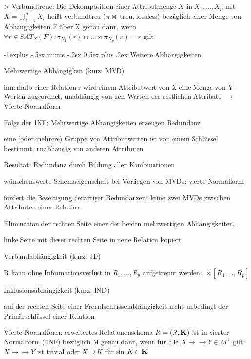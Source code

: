 \documentclass[a4paper]{article}
\makeatletter
\renewcommand{\subsection}{\@startsection{subsection}{2}{0mm}%
                                {-1explus -.5ex minus -.2ex}%
                                {0.5ex plus .2ex}%
                                {\normalfont\normalsize\bfseries}}
\makeatother
\begin{document}
\begin{multicols}{3}
> Verbundtreue: Die Dekomposition einer Attributmenge $X$ in $X_1,..., X_p$ mit $X = \bigcup_{i=1}^p X_i$ heißt verbundtreu ($\pi \bowtie$-treu, lossless) bezüglich einer Menge von Abhängigkeiten F über X genau dann, wenn $\forall r \in SAT_X(F): \pi_{X_1}(r) \bowtie ... \bowtie \pi_{X_p}(r) = r$ gilt.

\subsection{Weitere Abhängigkeiten}
\begin{itemize*}
    \item Mehrwertige Abhängigkeit (kurz: MVD)
    \begin{itemize*}
        \item innerhalb einer Relation r wird einem Attributwert von X eine Menge von Y-Werten zugeordnet, unabhängig von den Werten der restlichen Attribute $\rightarrow$ Vierte Normalform
        \item Folge der 1NF: Mehrwertige Abhängigkeiten erzeugen Redundanz
        \item eine (oder mehrere) Gruppe von Attributwerten ist von einem Schlüssel bestimmt, unabhängig von anderen Attributen
        \item Resultat: Redundanz durch Bildung aller Kombinationen
        \item wünschenswerte Schemaeigenschaft bei Vorliegen von MVDs: vierte Normalform
        \item fordert die Beseitigung derartiger Redundanzen: keine zwei MVDs zwischen Attributen einer Relation
        \item Elimination der rechten Seite einer der beiden mehrwertigen Abhängigkeiten,
        \item linke Seite mit dieser rechten Seite in neue Relation kopiert
        \item Verbundabhängigkeit (kurz: JD)
        \item R kann ohne Informationsverlust in $R_1,..., R_p$ aufgetrennt werden: $\bowtie [R_1,..., R_p]$
        \item Inklusionsabhängigkeit (kurz: IND)
        \item auf der rechten Seite einer Fremdschlüsselabhängigkeit nicht unbedingt der Primärschlüssel einer Relation
    \end{itemize*}
\end{itemize*}

Vierte Normalform: erweitertes Relationenschema $R = (R, \bf{K})$ ist in vierter Normalform (4NF) bezüglich M genau dann, wenn für alle $X\rightarrow\rightarrow Y \in M^+$ gilt: $X\rightarrow\rightarrow Y$ ist trivial oder $X\supseteq K$ für ein $K\in\bf{K}$



\end{multicols}
\end{document}
